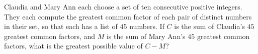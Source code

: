 Claudia and Mary Ann each choose a set of ten consecutive positive integers. They each compute the greatest common factor of each pair of distinct numbers in their set, so that each has a list of $45$ numbers. If $C$ is the sum of Claudia's $45$ greatest common factors, and $M$ is the sum of Mary Ann's $45$ greatest common factors, what is the greatest possible value of $C-M$?
